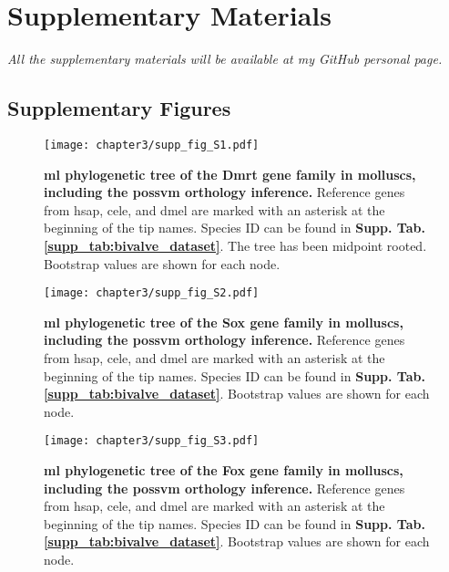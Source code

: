 \documentclass[../main.tex]{subfiles}
\begin{document}
\clearpage

\section{Supplementary Materials} \label{chapter3_supp}

\textit{All the supplementary materials will be available at my GitHub personal page.}

\subsection{Supplementary Figures}

\setcounter{figure}{0}
\renewcommand{\figurename}{Supplementary Figure}
\renewcommand{\thefigure}{S\arabic{chapter}.\arabic{figure}}

\begin{figure}[ht]
	\centering
	\texttt{[image: chapter3/supp\_fig\_S1.pdf]}
	\captionsetup{width=\textwidth}
	\caption{
		\textbf{\gls{ml} phylogenetic tree of the Dmrt gene family in molluscs, including the possvm orthology inference.} Reference genes from \gls{hsap}, \gls{cele}, and \gls{dmel} are marked with an asterisk at the beginning of the tip names. Species ID can be found in \textbf{Supp. Tab. \ref{supp_tab:bivalve_dataset}}. The tree has been midpoint rooted. Bootstrap values are shown for each node.
	}
	\label{suppFig:dmrt_bivalves}
\end{figure}

\begin{figure}[ht]
	\centering
	\texttt{[image: chapter3/supp\_fig\_S2.pdf]}
	\captionsetup{width=\textwidth}
	\caption{
		\textbf{\gls{ml} phylogenetic tree of the Sox gene family in molluscs, including the possvm orthology inference.} Reference genes from \gls{hsap}, \gls{cele}, and \gls{dmel} are marked with an asterisk at the beginning of the tip names. Species ID can be found in \textbf{Supp. Tab. \ref{supp_tab:bivalve_dataset}}. Bootstrap values are shown for each node.
	}
	\label{suppFig:sox_bivalves}
\end{figure}

\begin{figure}[ht]
	\centering
	\texttt{[image: chapter3/supp\_fig\_S3.pdf]}
	\captionsetup{width=\textwidth}
	\caption{
		\textbf{\gls{ml} phylogenetic tree of the Fox gene family in molluscs, including the possvm orthology inference.} Reference genes from \gls{hsap}, \gls{cele}, and \gls{dmel} are marked with an asterisk at the beginning of the tip names. Species ID can be found in \textbf{Supp. Tab. \ref{supp_tab:bivalve_dataset}}. Bootstrap values are shown for each node.
	}
	\label{suppFig:fox_bivalves}
\end{figure}
\end{document}
